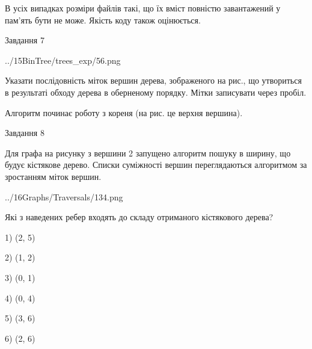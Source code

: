 \documentclass[12pt, ukrainian]{article}
\begin{document}
{В усіх випадках розміри файлів такі, що їх вміст повністю завантажений у пам'ять бути не може. Якість коду також оцінюється.



\vspace{10mm}\par

\newpage
\begin{minipage}[t]{9.7cm}
               
{\begin{center}Завдання {7}\end{center}}
\vspace{-4mm}

\begin{center}
	{../15BinTree/trees_exp/56.png}
\end{center}
Указати послідовність міток вершин дерева, зображеного на рис., що утвориться в результаті обходу дерева в оберненому порядку. Мітки записувати через пробіл.\par Алгоритм починає роботу з кореня (на рис. це верхня вершина).\par

\end{minipage}
\vline \hspace{8mm}
\begin{minipage}[t]{8.0cm}
               
{\begin{center}Завдання {8}\end{center}}
\vspace{-4mm}
Для графа на рисунку з вершини 2 запущено алгоритм пошуку в ширину, що будує кістякове дерево. Списки суміжності вершин переглядаються алгоритмом за зростанням міток вершин.\par
\begin{center}
	{../16Graphs/Traversals/134.png}
\end{center}
\par Які з наведених ребер входять до складу отриманого кістякового дерева?\par
1) (2, 5)\par
2) (1, 2)\par
3) (0, 1)\par
4) (0, 4)\par
5) (3, 6)\par
6) (2, 6)\par
{\vskip 15pt} \par


\end{minipage}}
\end{document}

